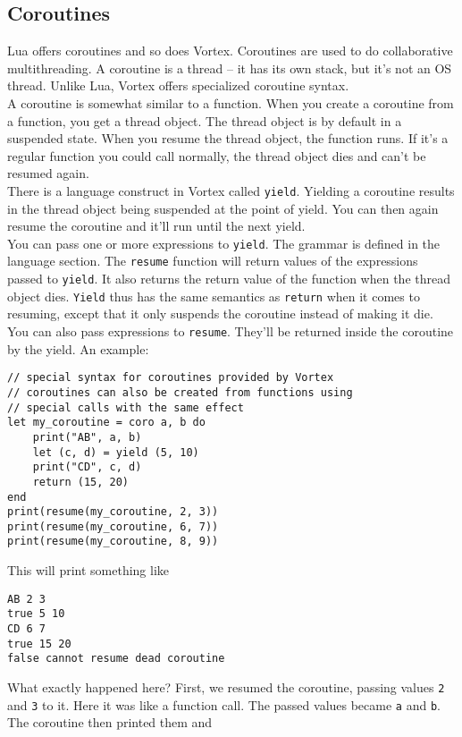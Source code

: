 \documentclass{article}
\begin{document}
\subsection{Coroutines}
Lua offers coroutines and so does Vortex. Coroutines are used to do
collaborative multithreading. A coroutine is a thread -- it has its own
stack, but it's not an OS thread. Unlike Lua, Vortex offers specialized
coroutine syntax.\\
A coroutine is somewhat similar to a function. When you create a coroutine
from a function, you get a thread object. The thread object is by default in
a suspended state. When you resume the thread object, the function runs. If
it's a regular function you could call normally, the thread object dies and
can't be resumed again.\\
There is a language construct in Vortex called \verb|yield|. Yielding a
coroutine results in the thread object being suspended at the point of
yield. You can then again resume the coroutine and it'll run until the
next yield.\\
You can pass one or more expressions to \verb|yield|. The grammar is defined
in the language section. The \verb|resume| function will return values
of the expressions passed to \verb|yield|. It also returns the return
value of the function when the thread object dies. \verb|Yield| thus has
the same semantics as \verb|return| when it comes to resuming, except that
it only suspends the coroutine instead of making it die.\\
You can also pass expressions to \verb|resume|. They'll be returned inside
the coroutine by the yield. An example:
\begin{lstlisting}[language=vortex]
// special syntax for coroutines provided by Vortex
// coroutines can also be created from functions using
// special calls with the same effect
let my_coroutine = coro a, b do
    print("AB", a, b)
    let (c, d) = yield (5, 10)
    print("CD", c, d)
    return (15, 20)
end
print(resume(my_coroutine, 2, 3))
print(resume(my_coroutine, 6, 7))
print(resume(my_coroutine, 8, 9))
\end{lstlisting}
This will print something like
\begin{lstlisting}[language=text]
AB 2 3
true 5 10
CD 6 7
true 15 20
false cannot resume dead coroutine
\end{lstlisting}
What exactly happened here? First, we resumed the coroutine, passing values
\verb|2| and \verb|3| to it. Here it was like a function call. The passed
values became \verb|a| and \verb|b|. The coroutine then printed them and
\end{document}
